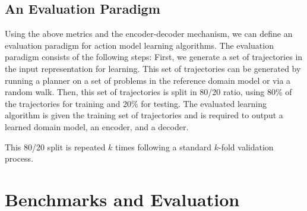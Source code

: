 \documentclass{article}
\theoremstyle{definition}
\theoremstyle{remark}
\newif\ifaddcomments
\newcommand{\todo}[1]{\ifaddcomments{\textcolor{red}{[TODO: #1]}}\fi}
\newcommand{\roni}[1]{\ifaddcomments{\textcolor{red}{[Roni: #1]}}\fi}
\newcommand{\yarin}[1]{\ifaddcomments{\textcolor{teal}{[Yarin: #1]}}\fi}
\newcommand{\cm}[1]{\ifaddcomments{\textcolor{olive}{[Christian: #1]}}\fi}
\begin{document}
\yarin{Add NOLAM too?}
\roni{Most important: anyone can help here?}


\subsection{An Evaluation Paradigm}
\roni{Leonardo will merge this into the next section}
Using the above metrics and the encoder-decoder mechanism, we can define an evaluation paradigm for action model learning algorithms.
The evaluation paradigm consists of the following steps: 
First, we generate a set of trajectories in the input representation for learning. 
This set of trajectories can be generated by running a planner on a set of problems in the reference domain model or via a random walk.
Then, this set of trajectories is split in 80/20 ratio, using 80\% of the trajectories for training and 20\% for testing. 
The evaluated learning algorithm is given the training set of trajectories and is required to output a learned domain model, an encoder, and a decoder. 
\roni{TODO for myself: Complete this subsection}
This 80/20 split is repeated $k$ times following a standard $k$-fold validation process. 

\cm{An eval-heavy ICAPS'er may take issue with some of the suggestions (random walks are hard to do right, the benchmark problem sets aren't IID, etc, etc. I'd say we're probably mostly fine (someone can always find some issue if they try hard enough), but we \textit{should} comment on the disconnect of trace -vs- state. Many approaches require traces, but the evals require state sets. Taking the latter to just be states along traces is a deliberate choice that warrants discussion.}



\section{Benchmarks and Evaluation}

\todo{Leonardo is in charge of this section.}
\end{document}

